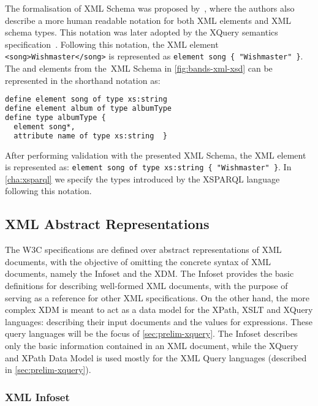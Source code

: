 The formalisation of \ac{XML} Schema was proposed by~\citet{SimeonWadler:2003aa}, where the authors also describe a more
human readable notation for both \ac{XML} elements and \ac{XML} schema types.  This notation was later adopted by the
XQuery semantics specification~\cite{DraperFankhauserFernandez:2010aa}.
%
Following this notation, the \ac{XML} element
%
\lstinline[basicstyle=\small\ttfamily]{<song>Wishmaster</song>}
%
is represented as
%
\lstinline[basicstyle=\small\ttfamily]+element song { "Wishmaster" }+.
%
The  and  elements from the~\ac{XML} Schema in \cref{fig:bands-xml-xsd} can
be represented in the shorthand notation as:
%
\begin{lstlisting}[language=XML,basicstyle=\small\ttfamily,frame=none,numbers=none]
define element song of type xs:string
define element album of type albumType
define type albumType {
  element song*,
  attribute name of type xs:string  }
\end{lstlisting}
%
After performing validation with the presented \ac{XML} Schema, the \ac{XML} element is represented as:
\lstinline[basicstyle=\small\ttfamily]+element song of type xs:string { "Wishmaster" }+.
%
In \cref{cha:xsparql} we specify the types introduced by the XSPARQL language following this notation.


\subsection{XML Abstract Representations}
\label{sec:xml-data-models}

The \ac{W3C} specifications are defined over abstract representations of \ac{XML} documents, with the objective of
omitting the concrete syntax of \ac{XML} documents, namely the \ac{Infoset} and the \ac{XDM}.
%
The \ac{Infoset} provides the basic definitions for describing well-formed \ac{XML} documents, with the purpose of
serving as a reference for other \ac{XML} specifications.
%
On the other hand, the more complex \ac{XDM} is meant to act as a data model for the XPath, XSLT and XQuery languages:
describing their input documents and the values for expressions.  These query languages will be the focus of
\cref{sec:prelim-xquery}.
%
The \ac{Infoset} describes only the basic information contained in an \ac{XML} document, while the XQuery and XPath Data
Model is used mostly for the \ac{XML} Query languages (described in \cref{sec:prelim-xquery}).

\subsubsection{XML Infoset}
\label{sec:xml-infoset}

